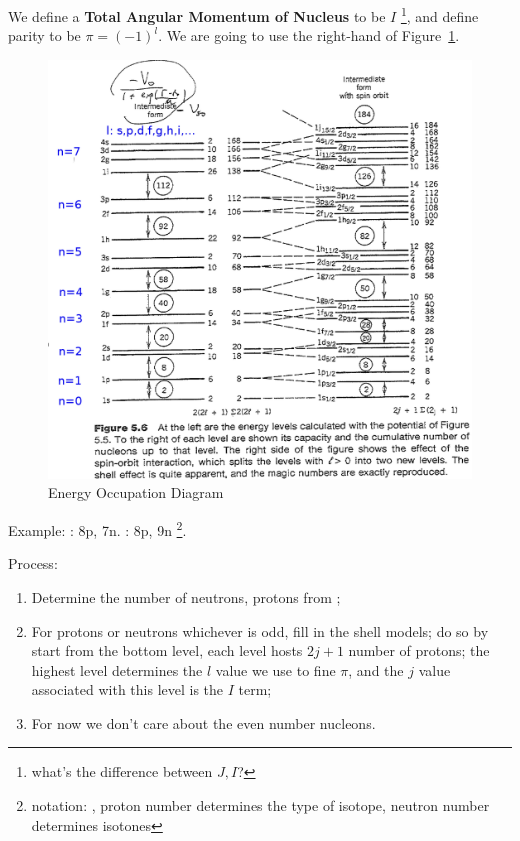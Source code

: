 \documentclass{school-22.101-notes}
\date{November 9, 2011}
\begin{document}
\maketitle


We define a \textbf{Total Angular Momentum of Nucleus} to be $I$ \footnote{what's the difference between $J, I$? }, and define parity to be $\pi = (-1)^l$. We are going to use the right-hand of Figure~\ref{ns-magic-numbers}.
\begin{figure}[ht]
    \centering
    \includegraphics[width=5in]{images/ns/magic-numbers.png}
    \caption{Energy Occupation Diagram}
    \label{ns-magic-numbers}
\end{figure}

Example: : 8p, 7n. : 8p, 9n \footnote{notation: , proton number determines the type of isotope, neutron number determines isotones}. 

Process: 
\begin{enumerate}
\item Determine the number of neutrons, protons from ;
\item For protons or neutrons whichever is odd, fill in the shell models; do so by start from the bottom level, each level hosts $2j+1$ number of protons; the highest level determines the $l$ value we use to fine $\pi$, and the $j$ value associated with this level is the $I$ term;
\item For now we don't care about the even number nucleons. 
\end{enumerate}
\end{document}
